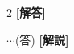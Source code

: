 \documentclass[../../main.tex]{subfiles}
\begin{document}
\setcounter{equation}{0}
\begin{oframed}
  
\end{oframed}
\setlength{\columnseprule}{0.4pt}
\begin{multicols}{2}
  {\bf [解答]}

  $\cdots$(答)
  {\bf [解説]}

  \newpage
\end{multicols}
\end{document}
